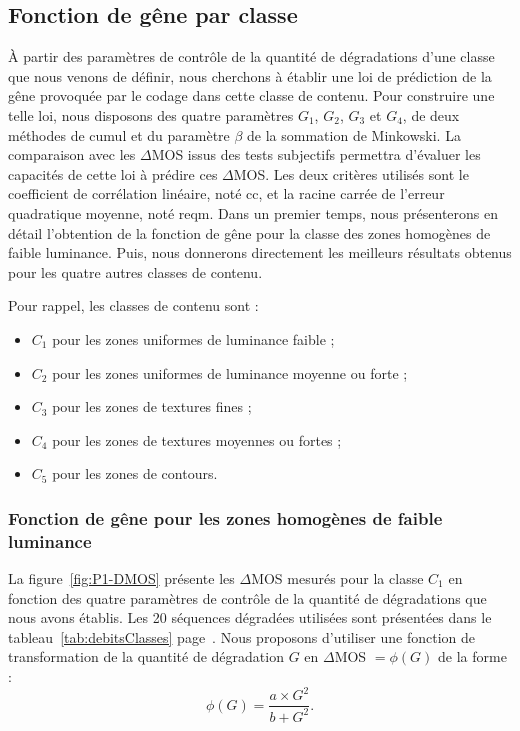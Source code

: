 \subsection{Fonction de gêne par classe}
À partir des paramètres de contrôle de la quantité de dégradations d'une classe que nous venons de définir, nous cherchons à établir une loi de prédiction de la gêne provoquée par le codage \avc{} dans cette classe de contenu. Pour construire une telle loi, nous disposons des quatre paramètres $G_1$, $G_2$, $G_3$ et $G_4$, de deux méthodes de cumul et du paramètre $\beta$ de la sommation de Minkowski. La comparaison avec les $\Delta$MOS issus des tests subjectifs permettra d'évaluer les capacités de cette loi à prédire ces $\Delta$MOS. Les deux critères utilisés sont le coefficient de corrélation linéaire, noté cc, et la racine carrée de l'erreur quadratique moyenne, noté reqm. Dans un premier temps, nous présenterons en détail l'obtention de la fonction de gêne pour la classe des zones homogènes de faible luminance. Puis, nous donnerons directement les meilleurs résultats obtenus pour les quatre autres classes de contenu.

Pour rappel, les classes de contenu sont :
\begin{itemize}
\item $C_1$ pour les zones uniformes de luminance faible ;
\item $C_2$ pour les zones uniformes de luminance moyenne ou forte ;
\item $C_3$ pour les zones de textures fines ;
\item $C_4$ pour les zones de textures moyennes ou fortes ;
\item $C_5$ pour les zones de contours.
\end{itemize}


\subsubsection{Fonction de gêne pour les zones homogènes de faible luminance}
La figure~\ref{fig:P1-DMOS} présente les $\Delta$MOS mesurés pour la classe $C_1$ en fonction des quatre paramètres de contrôle de la quantité de dégradations que nous avons établis. Les 20 séquences dégradées utilisées sont présentées dans le tableau~\ref{tab:debitsClasses} page~\pageref{tab:debitsClasses}. Nous proposons d'utiliser une fonction de transformation de la quantité de dégradation $G$ en $\Delta$MOS $=\phi(G)$ de la forme :
\begin{equation}
\phi(G) = \frac{a \times G^2}{b + G^2}.
\end{equation}


